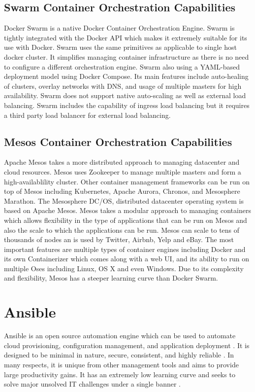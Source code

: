 \documentclass[9pt,twocolumn,twoside]{../../styles/osajnl}
\begin{document}
\subsection{Swarm Container Orchestration Capabilities}
Docker Swarm is a native Docker Container Orchestration Engine. Swarm
is tightly integrated with the Docker API which makes it extremely
suitable for its use with Docker. Swarm uses the same primitives as
applicable to single host docker cluster. It simplifies managing
container infrastructure as there is no need to configure a different
orchestration engine. Swarm also using a YAML-based deployment model
using Docker Compose. Its main features include auto-healing of
clusters, overlay networks with DNS, and usage of multiple masters for
high availability. Swarm does not support native auto-scaling as well
as external load balancing. Swarm includes the capability of ingress
load balancing but it requires a third party load balancer for
external load balancing.

\subsection{Mesos Container Orchestration Capabilities}
Apache Mesos takes a more distributed approach to managing datacenter
and cloud resources. Mesos uses Zookeeper to manage multiple masters
and form a high-availablility cluster. Other container management
frameworks can be run on top of Mesos including Kubernetes, Apache
Aurora, Chronos, and Mesosphere Marathon. The Mesosphere DC/OS,
distributed datacenter operating system is based on Apache
Mesos. Mesos takes a modular approach to managing containers which
allows flexibility in the type of applications that can be run on
Mesos and also the scale to which the applications can be run. Mesos
can scale to tens of thousands of nodes an is used by Twitter, Airbnb,
Yelp and eBay. The most important features are multiple types of
container engines including Docker and its own Containerizer which
comes along with a web UI, and its ability to run on multiple Oses
including Linux, OS X and even Windows. Due to its complexity and
flexibility, Mesos has a steeper learning curve than Docker Swarm.

\section{Ansible}

Ansible is an open source automation engine which can be used to
automate cloud provisioning, configuration management, and application
deployment \cite{www-ansible-wikipedia}. It is designed to be minimal
in nature, secure, consistent, and highly reliable
\cite{www-ansible3}. In many respects, it is unique from other
management tools and aims to provide large productivity gains. It has
an extremely low learning curve and seeks to solve major unsolved IT
challenges under a single banner \cite{www-ansible-wikipedia}.
\end{document}
